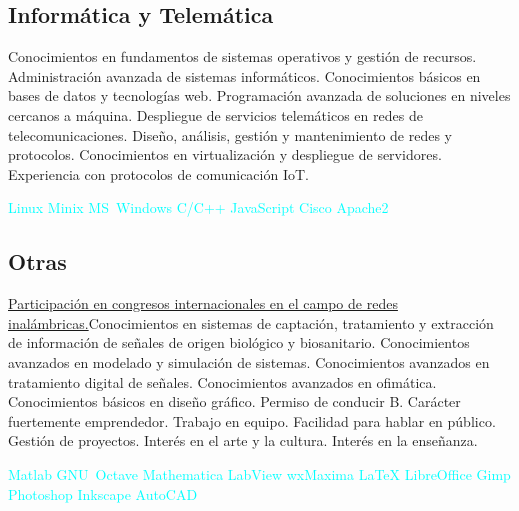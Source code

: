 \documentclass[11pt,a4paper,sans,spanish]{moderncv}
\begin{document}
\subsection{Informática y Telemática}
{Conocimientos en fundamentos de sistemas operativos y gestión de recursos.}\quad
{Administración avanzada de sistemas informáticos.}\quad
{Conocimientos básicos en bases de datos y tecnologías web.}\quad
{Programación avanzada de soluciones en niveles cercanos a máquina.}\quad
{Despliegue de servicios telemáticos en redes de telecomunicaciones. }\quad
{Diseño, análisis, gestión y mantenimiento de redes y protocolos.}\quad
{Conocimientos en virtualización y despliegue de servidores.}\quad
{Experiencia con protocolos de comunicación IoT.}

\begin{center}
\textcolor{cyan}{
Linux \quad{} Minix \quad{} MS~Windows \quad{} C/C++ \quad{} JavaScript \quad{} Cisco \quad{} Apache2
}
\end{center}

\subsection{Otras}
\href{http://ieeexplore.ieee.org/stamp/stamp.jsp?tp=&arnumber=7733012&isnumber=7732953}{Participación en congresos internacionales en el campo de redes inalámbricas.}\quad Conocimientos en sistemas de captación, tratamiento y extracción de información de señales de origen biológico y biosanitario.\quad
Conocimientos avanzados en modelado y simulación de sistemas.\quad
Conocimientos avanzados en tratamiento digital de señales.\quad
Conocimientos avanzados en ofimática.\quad
Conocimientos básicos en diseño gráfico.\quad
Permiso de conducir B. \quad{} Carácter fuertemente emprendedor. \quad{} Trabajo en equipo. \quad{} Facilidad para hablar en público. \quad{} Gestión de proyectos. \quad{} Interés en el arte y la cultura. \quad{} Interés en la enseñanza.

\begin{center}
\textcolor{cyan}{
Matlab \quad{} GNU~Octave \quad{} Mathematica \quad{} LabView \quad{} wxMaxima \quad{} LaTeX \quad{} LibreOffice \quad{} Gimp \quad{} Photoshop \quad{} Inkscape \quad{} AutoCAD
}
\end{center}
\end{document}
